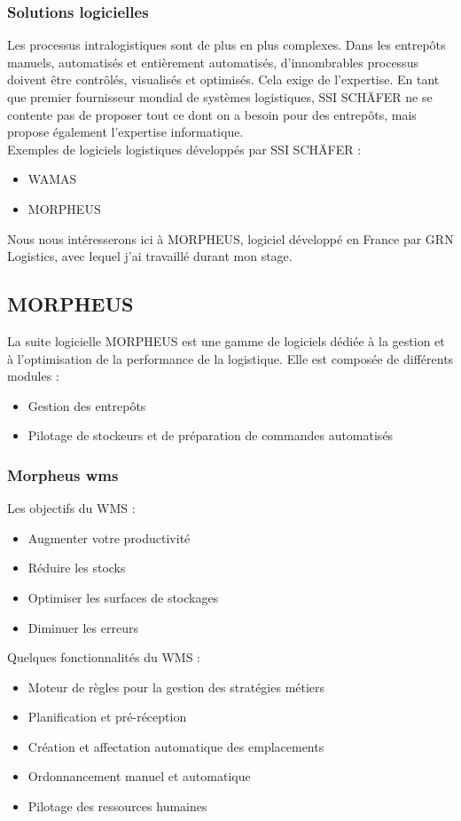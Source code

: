 \documentclass[a4paper, 12pt, french]{article}
\newcommand{\bdot}{\item[\color{ssiYellow}\ding{108}]}
\begin{document}
			\subsubsection{Solutions logicielles}
	Les processus intralogistiques sont de plus en plus complexes. Dans les entrepôts manuels, automatisés et entièrement automatisés, d'innombrables processus doivent être contrôlés, visualisés et optimisés. Cela exige de l'expertise. En tant que premier fournisseur mondial de systèmes logistiques, SSI SCHÄFER ne se contente pas de proposer tout ce dont on a besoin pour des entrepôts, mais propose également l'expertise informatique.\\

				\noindent
				Exemples de logiciels logistiques développés par SSI SCHÄFER :
				\begin{itemize}
					\bdot{WAMAS}
					\bdot{MORPHEUS}
				\end{itemize}
				\vspace{\baselineskip}
				\par Nous nous intéresserons ici à MORPHEUS, logiciel développé en France par GRN Logistics, avec lequel j'ai travaillé durant mon stage.
		\subsection{MORPHEUS}
	La suite logicielle MORPHEUS est une gamme de logiciels dédiée à la gestion et à l'optimisation de la performance de la logistique. Elle est composée de différents modules :
			\begin{itemize}
				\bdot{Gestion des entrepôts}
				\bdot{Pilotage de stockeurs et de préparation de commandes automatisés}
			\end{itemize}
			\subsubsection{Morpheus \acrshort{wms}}
				\noindent				
				Les objectifs du WMS :%
				\begin{itemize}
					\bdot{Augmenter votre productivité}
					\bdot{Réduire les stocks}
					\bdot{Optimiser les surfaces de stockages}
					\bdot{Diminuer les erreurs}
				\end{itemize}
				\vspace{\baselineskip}
				Quelques fonctionnalités du WMS :
				\begin{itemize}
					\bdot{Moteur de règles pour la gestion des stratégies métiers}
					\bdot{Planification et pré-réception}
					\bdot{Création et affectation automatique des emplacements}
					\bdot{Ordonnancement manuel et automatique}
					\bdot{Pilotage des ressources humaines}
				\end{itemize}
\end{document}
